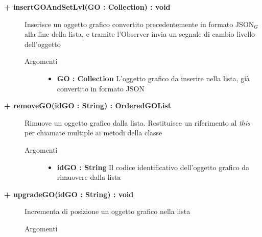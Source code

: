 \begin{description}
	\begin{description}
		\item[\textbf{\color{blue}+ insertGOAndSetLvl(GO : Collection) : void			}] \hfill
			Inserisce un oggetto grafico convertito precedentemente in formato JSON$_G$ alla fine della lista, e tramite l'Observer invia un segnale di cambio livello dell'oggetto
			
		\begin{description}
			\item[Argomenti] \hfill
				\begin{itemize}
				
					\item \textbf{GO : Collection			} \hfill
					L'oggetto grafico da inserire nella lista, già convertito in formato JSON
					
				\end{itemize}
		\end{description}
	\end{description}
	
	\begin{description}
		\item[\textbf{\color{blue}+ removeGO(idGO : String) : OrderedGOList			}] \hfill
			Rimuove un oggetto grafico dalla lista. Restituisce un riferimento al \textit{this} per chiamate multiple ai metodi della classe 
			
		\begin{description}
			\item[Argomenti] \hfill
				\begin{itemize}
				
					\item \textbf{idGO : String			} \hfill
					Il codice identificativo dell'oggetto grafico da rimuovere dalla lista
					
				\end{itemize}
		\end{description}
	\end{description}
	
	\begin{description}
		\item[\textbf{\color{blue}+ upgradeGO(idGO : String) : void			}] \hfill
			Incrementa di posizione un oggetto grafico nella lista
			
		\begin{description}
			\item[Argomenti] \hfill
				\begin{itemize}
				

\end{itemize}
\end{description}
\end{description}
\end{description}
